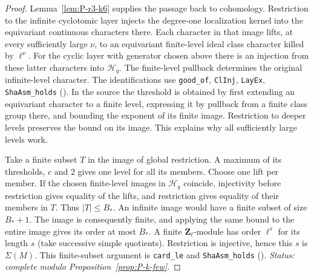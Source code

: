 \begin{proof}
Lemma~\ref{lem:P-r3-k6} supplies the passage back to cohomology. Restriction to the infinite
cyclotomic layer injects the degree-one localization kernel into the
equivariant continuous characters there. Each character in that image
lifts, at every sufficiently large $\nu$, to an equivariant finite-level
ideal class character killed by $\ell^\nu$. For the cyclic layer with
generator chosen above there is an injection from these latter characters
into $\mathcal H_q$. The finite-level pullback determines the original
infinite-level character. The identifications use
\nolinkurl{good_of}, \nolinkurl{ClInj}, \nolinkurl{LayEx},
\nolinkurl{ShaAsm_holds}
().
In the source the threshold is obtained by first extending an equivariant
character to a finite level, expressing it by pullback from a finite class
group there, and bounding the exponent of its finite image. Restriction
to deeper levels preserves the bound on its image. This explains why all
sufficiently large levels work.

Take a finite subset $T$ in the image of global restriction. A maximum
of its thresholds, $c$ and $2$ gives one level for all its members.
Choose one lift per member. If the chosen finite-level images in
$\mathcal H_q$ coincide, injectivity before restriction gives equality of
the lifts, and restriction gives equality of their members in $T$.
Thus $|T|\le B_*$. An infinite image would have a finite subset of size
$B_*+1$. The image is consequently finite, and applying the same bound
to the entire image gives its order at most $B_*$. A finite
$\mathbf Z_\ell$-module has order $\ell^s$ for its length $s$ (take
successive simple quotients). Restriction is injective, hence this $s$
is $\Sigma(M)$. This finite-subset argument is \nolinkurl{card_le} and
\nolinkurl{ShaAsm_holds} ().
\emph{Status: complete modulo Proposition~\ref{prop:P-k-few}.}
\end{proof}

